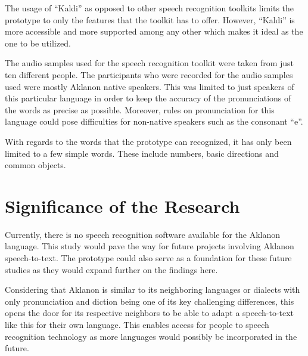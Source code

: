 The usage of “Kaldi” as opposed to other speech recognition toolkits limits the prototype to only the features that the toolkit has to offer. However, “Kaldi” is more accessible and more supported among any other which makes it ideal as the one to be utilized.

The audio samples used for the speech recognition toolkit were taken from just ten different people. The participants who were recorded for the audio samples used were mostly Aklanon native speakers. This was limited to just speakers of this particular language in order to keep the accuracy of the pronunciations of the words as precise as possible. Moreover, rules on pronunciation for this language could pose difficulties for non-native speakers such as the consonant “e”. 

With regards to the words that the prototype can recognized, it has only been limited to a few simple words. These include numbers, basic directions and common objects. 

\section{Significance of the Research}

Currently, there is no speech recognition software available for the Aklanon language. This study would pave the way for future projects involving Aklanon speech-to-text. The prototype could also serve as a foundation for these future studies as they would expand further on the findings here. 

Considering that Aklanon is similar to its neighboring languages or dialects with only pronunciation and diction being one of its key challenging differences, this opens the door for its respective neighbors to be able to adapt a speech-to-text like this for their own language. This enables access for people to speech recognition technology as more languages would possibly be incorporated in the future.




